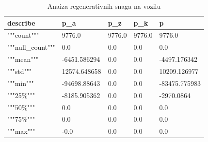 \begin{table}[!ht]
    \centering
    \caption{Anaiza regenerativnih snaga na vozilu}
    \begin{tabular}{lllll}
    \hline
        \textbf{describe} & \textbf{p\_a} & \textbf{p\_z} & \textbf{p\_k} & \textbf{p} \\ \hline
        """count""" & 9776.0 & 9776.0 & 9776.0 & 9776.0 \\ 
        """null\_count""" & 0.0 & 0.0 & 0.0 & 0.0 \\ 
        """mean""" & -6451.586294 & 0.0 & 0.0 & -4497.176342 \\ 
        """std""" & 12574.648658 & 0.0 & 0.0 & 10209.126977 \\ 
        """min""" & -94698.88643 & 0.0 & 0.0 & -83475.775983 \\ 
        """25\%""" & -8185.905362 & 0.0 & 0.0 & -2970.0864 \\ 
        """50\%""" & 0.0 & 0.0 & 0.0 & 0.0 \\ 
        """75\%""" & 0.0 & 0.0 & 0.0 & 0.0 \\ 
        """max""" & -0.0 & 0.0 & 0.0 & 0.0 \\ \hline
    \end{tabular}
    \label{table:c:regen_powers}
\end{table}
